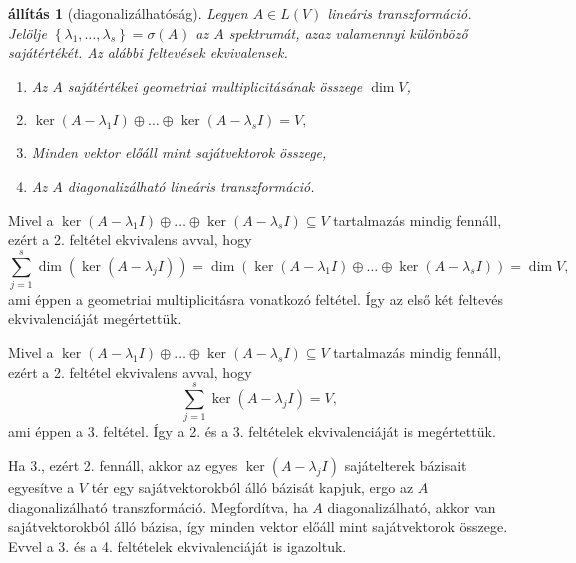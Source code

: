 \documentclass[9pt, a4paper, showtrims]{memoir}
\makeatletter
\renewenvironment{proof}[1][\proofname]
    {\par\pushQED{\qed}%
    \normalfont \topsep6\p@\@plus6\p@\relax
    \trivlist
    \item[\hskip\labelsep
        \itshape
    #1\@addpunct{:}]\ignorespaces}
    {\popQED\endtrivlist\@endpefalse}
\theoremstyle{plain}
\newtheorem{proposition}{állítás}[chapter]
\theoremstyle{remark}
\theoremstyle{definition}
\makeatother
\begin{document}
    \begin{proposition}[diagonalizálhatóság]\label{pr:diagkar}
        Legyen $A\in L\left( V \right)$ lineáris transzformáció.
        Jelölje $\left\{ \lambda_1,\dots,\lambda_s \right\}=\sigma\left( A \right)$
        az $A$ spektrumát, 
        azaz valamennyi különböző sajátértékét.
        Az alábbi feltevések ekvivalensek.
        \begin{enumerate}
            \item Az $A$ sajátértékei geometriai multiplicitásának összege $\dim V$,
            \item 
                \begin{math}
                    \ker\left( A-\lambda_1 I \right)\oplus\dots\oplus\ker\left( A-\lambda_s I \right)=V,
                \end{math}
            \item Minden vektor előáll mint sajátvektorok összege,
            \item Az $A$ diagonalizálható lineáris transzformáció.\qedhere
        \end{enumerate}
    \end{proposition}
    \begin{proof}
        Mivel a $\ker\left( A-\lambda_1 I \right)\oplus\dots\oplus\ker\left( A-\lambda_s I \right)\subseteq V$ 
        tartalmazás mindig fennáll,
        ezért a 2. feltétel ekvivalens avval, hogy
        \[
            \sum_{j=1}^s\dim\left( \ker\left( A-\lambda_j I \right) \right)
            =
            \dim\left( 
            \ker\left( A-\lambda_1 I \right)\oplus\dots\oplus\ker\left( A-\lambda_s I \right)
            \right)
            =\dim V,
        \]
        ami éppen a geometriai multiplicitásra vonatkozó feltétel.
        Így az első két feltevés ekvivalenciáját megértettük.


        Mivel a $\ker\left( A-\lambda_1 I \right)\oplus\dots\oplus\ker\left( A-\lambda_s I \right)\subseteq V$ 
        tartalmazás mindig fennáll,
        ezért a 2. feltétel ekvivalens avval, hogy
        \[
            \sum_{j=1}^s\ker\left( A-\lambda_j I \right)=V,
        \]
        ami éppen a 3. feltétel.
        Így a 2. és a 3. feltételek ekvivalenciáját is megértettük.

        Ha 3., ezért 2. fennáll, akkor az egyes $\ker\left( A-\lambda_j I \right)$ sajátelterek bázisait egyesítve a 
        $V$ tér egy sajátvektorokból álló bázisát kapjuk, 
        ergo az $A$ diagonalizálható transzformáció.
        Megfordítva, 
        ha $A$ diagonalizálható, 
        akkor van sajátvektorokból álló bázisa, 
        így minden vektor előáll mint sajátvektorok összege.
        Evvel a 3. és a 4. feltételek ekvivalenciáját is igazoltuk.
    \end{proof}
\end{document}
